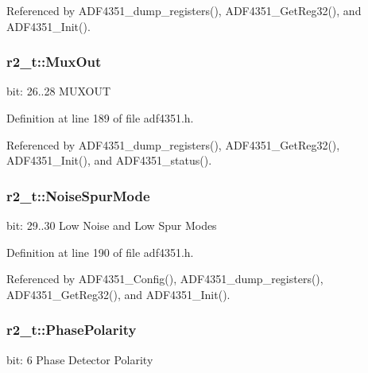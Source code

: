 Referenced by A\+D\+F4351\+\_\+dump\+\_\+registers(), A\+D\+F4351\+\_\+\+Get\+Reg32(), and A\+D\+F4351\+\_\+\+Init().

\subsubsection[{\texorpdfstring{Mux\+Out}{MuxOut}}]{ r2\+\_\+t\+::\+Mux\+Out}\hypertarget{structr2__t_a284292bd7e449b3c4641639ed6826310}{}\label{structr2__t_a284292bd7e449b3c4641639ed6826310}
bit\+: 26..28 M\+U\+X\+O\+UT 

Definition at line 189 of file adf4351.\+h.



Referenced by A\+D\+F4351\+\_\+dump\+\_\+registers(), A\+D\+F4351\+\_\+\+Get\+Reg32(), A\+D\+F4351\+\_\+\+Init(), and A\+D\+F4351\+\_\+status().

\subsubsection[{\texorpdfstring{Noise\+Spur\+Mode}{NoiseSpurMode}}]{ r2\+\_\+t\+::\+Noise\+Spur\+Mode}\hypertarget{structr2__t_a40bc8b8cb7d9e77e57abd0e8be4f01af}{}\label{structr2__t_a40bc8b8cb7d9e77e57abd0e8be4f01af}
bit\+: 29..30 Low Noise and Low Spur Modes 

Definition at line 190 of file adf4351.\+h.



Referenced by A\+D\+F4351\+\_\+\+Config(), A\+D\+F4351\+\_\+dump\+\_\+registers(), A\+D\+F4351\+\_\+\+Get\+Reg32(), and A\+D\+F4351\+\_\+\+Init().

\subsubsection[{\texorpdfstring{Phase\+Polarity}{PhasePolarity}}]{ r2\+\_\+t\+::\+Phase\+Polarity}\hypertarget{structr2__t_a05ebd4a6ece2e0641678b20f162e08ab}{}\label{structr2__t_a05ebd4a6ece2e0641678b20f162e08ab}
bit\+: 6 Phase Detector Polarity 

